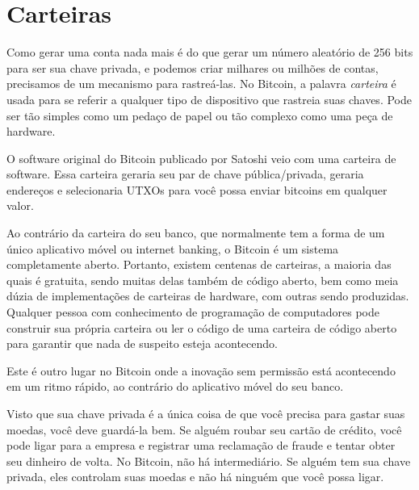 
\section*{Carteiras}

Como gerar uma conta nada mais é do que gerar um número aleatório de 256 bits para ser sua chave privada, e podemos criar milhares ou milhões de contas, precisamos de um mecanismo para rastreá-las. No Bitcoin, a palavra \textit{carteira} é usada para se referir a qualquer tipo de dispositivo que rastreia suas chaves. Pode ser tão simples como um pedaço de papel ou tão complexo como uma peça de hardware.

O software original do Bitcoin publicado por Satoshi veio com uma carteira de software. 
Essa carteira geraria seu par de chave pública/privada, geraria endereços e selecionaria UTXOs para você possa enviar bitcoins em qualquer valor.%

Ao contrário da carteira do seu banco, que normalmente tem a forma de um único aplicativo móvel ou internet banking, o Bitcoin é um sistema completamente aberto. Portanto, existem centenas de carteiras, a maioria das quais é gratuita, sendo muitas delas também de código aberto, bem como meia dúzia de implementações de carteiras de hardware, com outras sendo produzidas. Qualquer pessoa com conhecimento de programação de computadores pode construir sua própria carteira ou ler o código de uma carteira de código aberto para garantir que nada de suspeito esteja acontecendo. 

Este é outro lugar no Bitcoin onde a inovação sem permissão está acontecendo em um ritmo rápido, ao contrário do aplicativo móvel do seu banco.%

Visto que sua chave privada é a única coisa de que você precisa para gastar suas moedas, você deve guardá-la bem. Se alguém roubar seu cartão de crédito, você pode ligar para a empresa e registrar uma reclamação de fraude e tentar obter seu dinheiro de volta. No Bitcoin, não há intermediário. Se alguém tem sua chave privada, eles controlam suas moedas e não há ninguém que você possa ligar.


